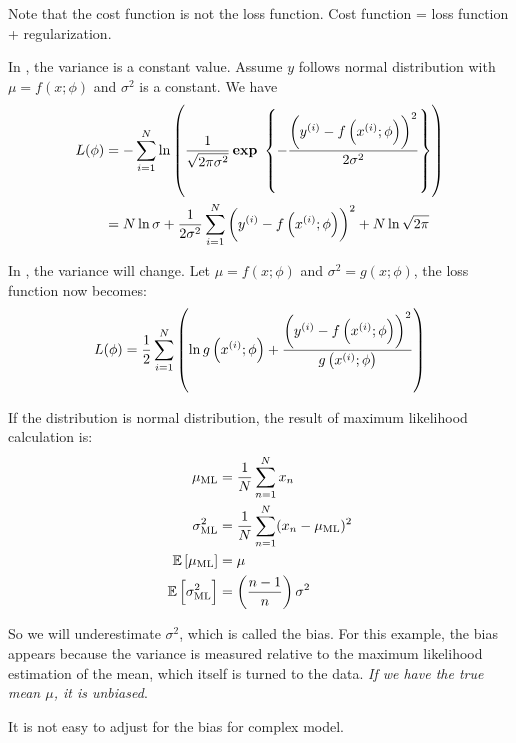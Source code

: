 Note that the cost function is not the loss function. Cost function = loss function + regularization.


In , the variance is a constant value. Assume $y$ follows normal distribution with $\mu = f(x;\phi)$ and $\sigma^2$ is a constant. We have 
\begin{equation}\label{homoscedastic_regression}
    \begin{aligned}
        L(\phi) &= - \sum_{i=1}^N \ln \left( \frac{1}{\sqrt{2\pi \sigma^2}} \mathop{\bf exp\/}~\set{- \frac{\left({y}^{(i)} - f\left({x}^{(i)};\phi\right)\right)^2}{2 \sigma^2}} \right) \\
        &= N \ln \sigma + \frac{1}{2 \sigma^2} \sum_{i=1}^N \left({y}^{(i)} - f\left({x}^{(i)};\phi\right)\right)^2 + N \ln \sqrt{2\pi}
    \end{aligned}
\end{equation}


In , the variance will change. Let $\mu = f(x;\phi)$ and $\sigma^2 = g(x;\phi)$, the loss function now becomes:
\begin{equation}
    L(\phi) = \frac{1}{2} \sum_{i=1}^N \left(\ln g\left({x}^{(i)};\phi\right) + \frac{\left({y}^{(i)} - f\left({x}^{(i)};\phi\right)\right)^2}{ g\left({x}^{(i)};\phi\right)} \right)
\end{equation}


\begin{definition}
    If the distribution is normal distribution, the result of maximum likelihood calculation is:
    \begin{equation}
        \begin{aligned}
            \mu_{\text{ML}} &= \frac{1}{N}\sum_{n=1}^N x_n \\
            \sigma^2_{\text{ML}} &= \frac{1}{N} \sum_{n=1}^N (x_n - \mu_{\text{ML}})^2 \\
            \mathbb{E}\left[{\mu_{\text{ML}}}\right] &= \mu \\
            \mathbb{E}\left[{\sigma^2_{\text{ML}}}\right] &= \left( \frac{n-1}{n} \right) \sigma^2
        \end{aligned}
    \end{equation}
    
    So we will underestimate $\sigma^2$, which is called the bias. For this example, the bias appears because the variance is measured relative to the maximum likelihood estimation of the mean, which itself is turned to the data. \emph{If we have the true mean $\mu$, it is unbiased}.
    
    It is not easy to adjust for the bias for complex model.
\end{definition}

